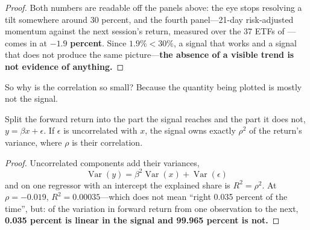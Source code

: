 \begin{proof}
Both numbers are readable off the panels above: the eye stops resolving a tilt somewhere around
30 percent, and the fourth panel---21-day risk-adjusted momentum against the next session's return,
measured over the 37 ETFs of ---comes in at
$\mathbf{-1.9}$ \textbf{percent}. Since $1.9\% < 30\%$, a signal that works and a signal that does
not produce the same picture---\textbf{the absence of a visible trend is not evidence of anything.}
\end{proof}

So why is the correlation so small? Because the quantity being plotted is mostly not the signal.

\begin{claim}\label{clm:r-squared}
Split the forward return into the part the signal reaches and the part it does not,
$y = \beta x + \epsilon$. If $\epsilon$ is uncorrelated with $x$, the signal owns exactly $\rho^2$
of the return's variance, where $\rho$ is their correlation.
\end{claim}

\begin{proof}
Uncorrelated components add their variances,
\[
  \operatorname{Var}(y) = \beta^2 \operatorname{Var}(x) + \operatorname{Var}(\epsilon)
\]
and on one regressor with an intercept the explained share is $R^2 = \rho^2$. At $\rho = -0.019$,
$R^2 = 0.00035$---which does not mean ``right 0.035 percent of the time'', but: of the variation in
forward return from one observation to the next, \textbf{0.035 percent is linear in the signal and
99.965 percent is not.}
\end{proof}

